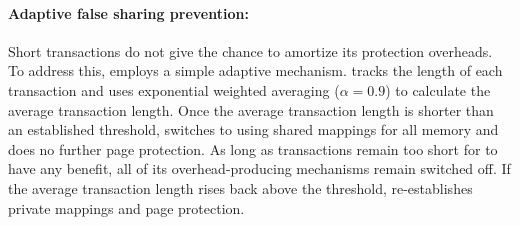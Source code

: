 \paragraph{Adaptive false sharing prevention:} 
  Short transactions do not give \sheriff{} the chance to amortize its
  protection overheads. To address this, \sheriffprotect{} employs a simple adaptive
  mechanism.  \sheriffprotect{} tracks the
  length of each transaction and uses exponential weighted averaging
  ($\alpha = 0.9$) to calculate the average transaction length.  Once
  the average transaction length is shorter than an established
  threshold, \sheriffprotect{} switches to using shared mappings for
  all memory and does no further page protection. As long as
  transactions remain too short for \sheriffprotect{} to have any
  benefit, all of its overhead-producing mechanisms remain switched
  off. If the average transaction length rises back above the
  threshold, \sheriffprotect{} re-establishes private mappings and
  page protection.

